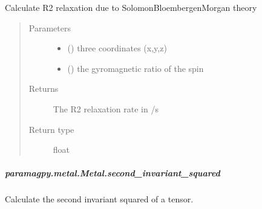 \documentclass[a4paper,10pt,english,openany,oneside]{sphinxmanual}
\begin{document}
\begin{fulllineitems}
\begin{fulllineitems}
\begin{fulllineitems}
\label{\detokenize{reference/generated/paramagpy.metal.Metal.sbm_r2:paramagpy.metal.Metal.sbm_r2}}
\sphinxAtStartPar
Calculate R2 relaxation due to Solomon\sphinxhyphen{}Bloembergen\sphinxhyphen{}Morgan theory
\begin{quote}\begin{description}
\item[{Parameters}] \leavevmode\begin{itemize}
\item {} 
\sphinxAtStartPar
{} () \textendash{} three coordinates (x,y,z)

\item {} 
\sphinxAtStartPar
{} () \textendash{} the gyromagnetic ratio of the spin

\end{itemize}

\item[{Returns}] \leavevmode
\sphinxAtStartPar
{} \textendash{} The R2 relaxation rate in /s

\item[{Return type}] \leavevmode
\sphinxAtStartPar
float

\end{description}\end{quote}

\end{fulllineitems}



\subparagraph{paramagpy.metal.Metal.second\_invariant\_squared}
\label{\detokenize{reference/generated/paramagpy.metal.Metal.second_invariant_squared:paramagpy-metal-metal-second-invariant-squared}}\label{\detokenize{reference/generated/paramagpy.metal.Metal.second_invariant_squared::doc}}

\begin{fulllineitems}
\label{\detokenize{reference/generated/paramagpy.metal.Metal.second_invariant_squared:paramagpy.metal.Metal.second_invariant_squared}}
\sphinxAtStartPar
Calculate the second invariant squared of a tensor.


\end{fulllineitems}
\end{fulllineitems}
\end{fulllineitems}
\end{document}
